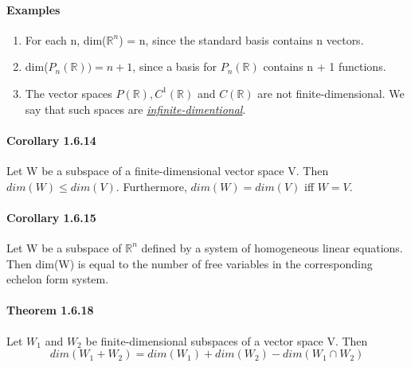 \documentclass[11pt]{article}
\newcommand{\mb}[1]{\mathbb{#1}}
\newcommand{\under}[1]{\underline{#1}}
\begin{document}
	\paragraph{Examples}
	\begin{enumerate}
		\item For each n, dim($\mb{R}^n$) = n, since the standard basis contains n vectors.
		\item dim($P_n(\mb{R})) = n + 1$, since a basis for $P_n(\mb{R})$ contains n + 1 functions.
		\item The vector spaces $P(\mb{R}), C^1(\mb{R})$ and $C(\mb{R})$ are not finite-dimensional. We say that such spaces are \under{\it{infinite-dimentional}}.
	\end{enumerate}
	\paragraph{Corollary 1.6.14} Let W be a subspace of a finite-dimensional vector space V. Then $dim(W) \leq dim(V).$ Furthermore, $	dim(W) = dim(V)$ iff $W = V$.
	
	\paragraph{Corollary 1.6.15} Let W be a subspace of $\mb{R}^n$ defined by a system of homogeneous linear equations. Then dim(W) is equal to the number of free variables in the corresponding echelon form system.
	\paragraph{Theorem 1.6.18} Let $W_1$ and $W_2$ be finite-dimensional subspaces of a vector space V. Then $$dim(W_1 + W_2) = dim(W_1) + dim(W_2) - dim(W_1 \cap W_2)$$
\end{document}
